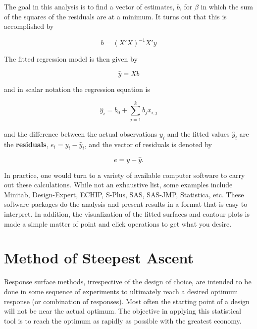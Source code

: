 
The goal in this analysis is to find a vector of estimates, $b$, for $\beta$ in which the sum of the squares of the residuals are at a minimum.  It turns out that this is accomplished by


\begin{equation}
b = (X'X)^{-1} X'y  
\end{equation}

The fitted regression model is then given by

\begin{equation}
\hat{y} = Xb
\end{equation}

and in scalar notation the regression equation is

\begin{equation}
\hat{y}_{i} = b_{0} + \sum^{k}_{j=1} b_{j} x_{i,j}
\end{equation}

and the difference between the actual observations $y_{i}$ and the fitted values $\hat{y}_{i}$ are the \textbf{residuals}, $e_{i} = y_{i} - \hat{y}_{i}$, and the vector of residuals is denoted by

\begin{equation}
e = y - \hat{y}.
\end{equation}

In practice, one would turn to a variety of available computer software to carry out these calculations.  While not an exhaustive list, some examples include Minitab, Design-Expert, ECHIP, S-Plus, SAS, SAS-JMP, Statistica, etc.  These software packages do the analysis and present results in a format that is easy to interpret.  In addition, the visualization of the fitted surfaces and contour plots is made a simple matter of point and click operations to get what you desire.

\section{Method of Steepest Ascent}
Response surface methods, irrespective of the design of choice, are intended to be done in some sequence of experiments to ultimately reach a desired optimum response (or combination of responses). Most often the starting point of a design will not be near the actual optimum. The objective in applying this statistical tool is to reach the optimum as rapidly as possible with the greatest economy. 

